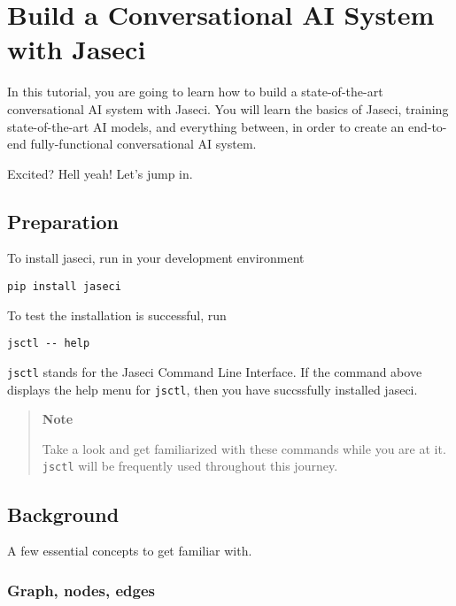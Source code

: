 \section{Build a Conversational AI System with
  Jaseci}\label{build-a-conversational-ai-system-with-jaseci}

In this tutorial, you are going to learn how to build a state-of-the-art
conversational AI system with Jaseci. You will learn the basics of
Jaseci, training state-of-the-art AI models, and everything between, in
order to create an end-to-end fully-functional conversational AI system.

Excited? Hell yeah! Let's jump in.

\subsection{Preparation}\label{preparation}

To install jaseci, run in your development environment

\begin{verbatim}
pip install jaseci
\end{verbatim}

To test the installation is successful, run

\begin{verbatim}
jsctl -- help
\end{verbatim}

\texttt{jsctl} stands for the Jaseci Command Line Interface. If the
command above displays the help menu for \texttt{jsctl}, then you have
succssfully installed jaseci.

\begin{quote}
    \textbf{Note}

    Take a look and get familiarized with these commands while you are at
    it. \texttt{jsctl} will be frequently used throughout this journey.
\end{quote}

\subsection{Background}\label{background}

A few essential concepts to get familiar with.

\subsubsection{Graph, nodes, edges}\label{graph-nodes-edges}

